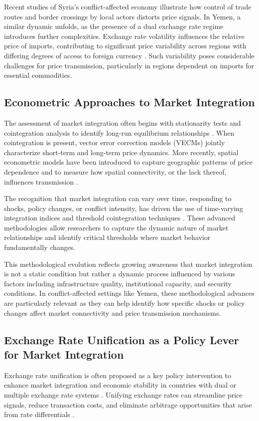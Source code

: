 Recent studies of Syria's conflict-affected economy \citep{mansour2021market} illustrate how control of trade routes and border crossings by local actors distorts price signals. In Yemen, a similar dynamic unfolds, as the presence of a dual exchange rate regime introduces further complexities. Exchange rate volatility influences the relative price of imports, contributing to significant price variability across regions with differing degrees of access to foreign currency \citep{worldbank2022yemen}. Such variability poses considerable challenges for price transmission, particularly in regions dependent on imports for essential commodities.

\subsection{Econometric Approaches to Market Integration} 
The assessment of market integration often begins with stationarity tests and cointegration analysis to identify long-run equilibrium relationships \citep{engle1987cointegration, johansen1988statistical}. When cointegration is present, vector error correction models (VECMs) jointly characterize short-term and long-term price dynamics. More recently, spatial econometric models have been introduced to capture geographic patterns of price dependence and to measure how spatial connectivity, or the lack thereof, influences transmission \citep{anselin1988spatial, fackler2001spatial}.

The recognition that market integration can vary over time, responding to shocks, policy changes, or conflict intensity, has driven the use of time-varying integration indices and threshold cointegration techniques \citep{hansen2002testing}. These advanced methodologies allow researchers to capture the dynamic nature of market relationships and identify critical thresholds where market behavior fundamentally changes.

This methodological evolution reflects growing awareness that market integration is not a static condition but rather a dynamic process influenced by various factors including infrastructure quality, institutional capacity, and security conditions. In conflict-affected settings like Yemen, these methodological advances are particularly relevant as they can help identify how specific shocks or policy changes affect market connectivity and price transmission mechanisms.

\subsection{Exchange Rate Unification as a Policy Lever for Market Integration} 
Exchange rate unification is often proposed as a key policy intervention to enhance market integration and economic stability in countries with dual or multiple exchange rate systems \citep{fackler2008estimating, ravallion1986testing}. Unifying exchange rates can streamline price signals, reduce transaction costs, and eliminate arbitrage opportunities that arise from rate differentials \citep{negassa2007estimating}.

